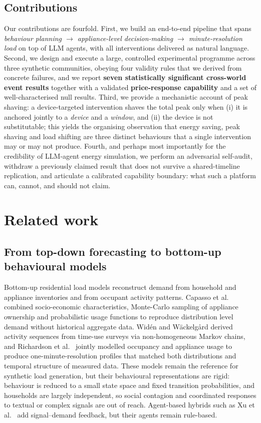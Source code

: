 \documentclass[11pt]{article}
\begin{document}
\subsection{Contributions}
Our contributions are fourfold. First, we build an end-to-end pipeline that spans
\emph{behaviour planning $\rightarrow$ appliance-level decision-making $\rightarrow$ minute-resolution
load} on top of LLM agents, with all interventions delivered as natural language. Second, we design and
execute a large, controlled experimental programme across three synthetic communities, obeying four
validity rules that we derived from concrete failures, and we report \textbf{seven statistically
significant cross-world event results} together with a validated \textbf{price-response capability} and a
set of well-characterised null results. Third, we provide a mechanistic account of peak shaving: a
device-targeted intervention shaves the total peak only when (i) it is anchored jointly to a
\emph{device} and a \emph{window}, and (ii) the device is not substitutable; this yields the organising
observation that energy saving, peak shaving and load shifting are three distinct behaviours that a single
intervention may or may not produce. Fourth, and perhaps most importantly for the credibility of
LLM-agent energy simulation, we perform an adversarial self-audit, withdraw a previously claimed result
that does not survive a shared-timeline replication, and articulate a calibrated capability boundary:
what such a platform can, cannot, and should not claim.

\section{Related work}

\subsection{From top-down forecasting to bottom-up behavioural models}
Bottom-up residential load models reconstruct demand from household and appliance inventories and from
occupant activity patterns. Capasso et al.\ \cite{capasso1994} combined socio-economic characteristics,
Monte-Carlo sampling of appliance ownership and probabilistic usage functions to reproduce distribution
level demand without historical aggregate data. Wid\'en and W\"ackelg\r{a}rd \cite{widen2010} derived
activity sequences from time-use surveys via non-homogeneous Markov chains, and Richardson et al.\
\cite{richardson2010} jointly modelled occupancy and appliance usage to produce one-minute-resolution
profiles that matched both distributions and temporal structure of measured data. These models remain the
reference for synthetic load generation, but their behavioural representations are rigid: behaviour is
reduced to a small state space and fixed transition probabilities, and households are largely independent,
so social contagion and coordinated responses to textual or complex signals are out of reach. Agent-based
hybrids such as Xu et al.\ \cite{xu2026} add signal--demand feedback, but their agents remain rule-based.
\end{document}

